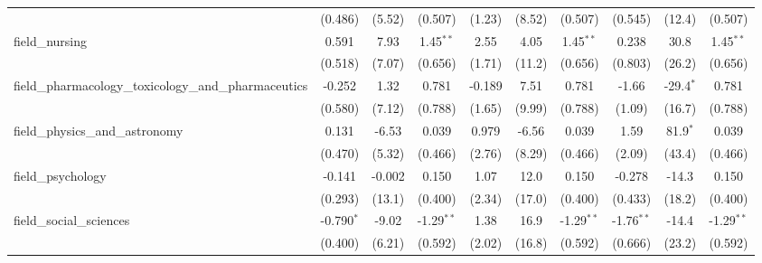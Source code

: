\begin{tabular}{lccccccccc}
                                                               & (0.486)        & (5.52)         & (0.507)       & (1.23)        & (8.52)         & (0.507)       & (0.545)        & (12.4)        & (0.507)\\   
   field\_nursing                                              & 0.591          & 7.93           & 1.45$^{**}$   & 2.55          & 4.05           & 1.45$^{**}$   & 0.238          & 30.8          & 1.45$^{**}$\\   
                                                               & (0.518)        & (7.07)         & (0.656)       & (1.71)        & (11.2)         & (0.656)       & (0.803)        & (26.2)        & (0.656)\\   
   field\_pharmacology\_toxicology\_and\_pharmaceutics         & -0.252         & 1.32           & 0.781         & -0.189        & 7.51           & 0.781         & -1.66          & -29.4$^{*}$   & 0.781\\   
                                                               & (0.580)        & (7.12)         & (0.788)       & (1.65)        & (9.99)         & (0.788)       & (1.09)         & (16.7)        & (0.788)\\   
   field\_physics\_and\_astronomy                              & 0.131          & -6.53          & 0.039         & 0.979         & -6.56          & 0.039         & 1.59           & 81.9$^{*}$    & 0.039\\   
                                                               & (0.470)        & (5.32)         & (0.466)       & (2.76)        & (8.29)         & (0.466)       & (2.09)         & (43.4)        & (0.466)\\   
   field\_psychology                                           & -0.141         & -0.002         & 0.150         & 1.07          & 12.0           & 0.150         & -0.278         & -14.3         & 0.150\\   
                                                               & (0.293)        & (13.1)         & (0.400)       & (2.34)        & (17.0)         & (0.400)       & (0.433)        & (18.2)        & (0.400)\\   
   field\_social\_sciences                                     & -0.790$^{*}$   & -9.02          & -1.29$^{**}$  & 1.38          & 16.9           & -1.29$^{**}$  & -1.76$^{**}$   & -14.4         & -1.29$^{**}$\\   
                                                               & (0.400)        & (6.21)         & (0.592)       & (2.02)        & (16.8)         & (0.592)       & (0.666)        & (23.2)        & (0.592)\\   

\end{tabular}
